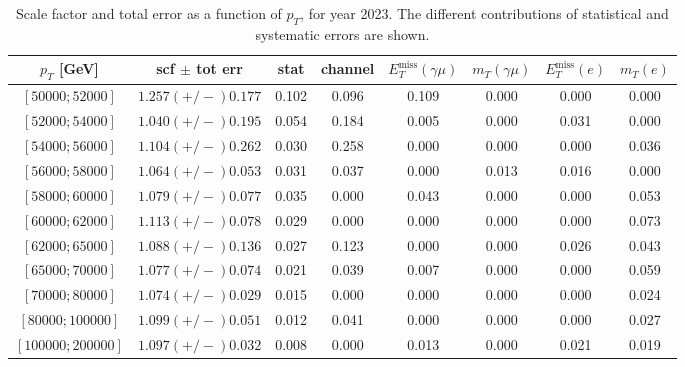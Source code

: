 \begin{table}[h]
  \centering
  \begin{tabular}{|c|c|c|c|c|c|c|c|}
    \hline
    $p_T$ [GeV] & scf $\pm$ tot err & stat & channel & $E_T^{\text{miss}}(\gamma\mu)$ & $m_T(\gamma\mu)$ &  $E_T^{\text{miss}}(e)$ & $m_T(e)$ \\
    \hline
    $[50000;52000]$ & $1.257(+/-)0.177$ & 0.102 &  0.096 & 0.109 & 0.000 & 0.000 &  0.000 \\
    $[52000;54000]$ & $1.040(+/-)0.195$ & 0.054 &  0.184 & 0.005 & 0.000 & 0.031 &  0.000 \\
    $[54000;56000]$ & $1.104(+/-)0.262$ & 0.030 &  0.258 & 0.000 & 0.000 & 0.000 &  0.036 \\
    $[56000;58000]$ & $1.064(+/-)0.053$ & 0.031 &  0.037 & 0.000 & 0.013 & 0.016 &  0.000 \\
    $[58000;60000]$ & $1.079(+/-)0.077$ & 0.035 &  0.000 & 0.043 & 0.000 & 0.000 &  0.053 \\
    $[60000;62000]$ & $1.113(+/-)0.078$ & 0.029 &  0.000 & 0.000 & 0.000 & 0.000 &  0.073 \\
    $[62000;65000]$ & $1.088(+/-)0.136$ & 0.027 &  0.123 & 0.000 & 0.000 & 0.026 &  0.043 \\
    $[65000;70000]$ & $1.077(+/-)0.074$ & 0.021 &  0.039 & 0.007 & 0.000 & 0.000 &  0.059 \\
    $[70000;80000]$ & $1.074(+/-)0.029$ & 0.015 &  0.000 & 0.000 & 0.000 & 0.000 &  0.024 \\
    $[80000;100000]$ & $1.099(+/-)0.051$ & 0.012 &  0.041 & 0.000 & 0.000 & 0.000 &  0.027 \\
    $[100000;200000]$ & $1.097(+/-)0.032$ & 0.008 &  0.000 & 0.013 & 0.000 & 0.021 &  0.019 \\
    \hline
  \end{tabular}
  \caption{Scale factor and total error as a function of $p_T$, for year 2023. The different contributions of statistical and systematic errors are shown.}
  \label{tab:scf-results-2023}
\end{table}

